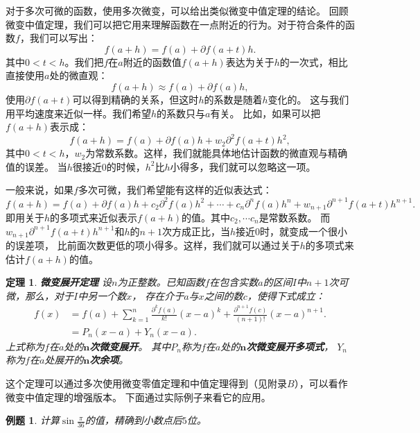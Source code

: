 \documentclass[12pt,UTF8]{ctexbook}
\newtheorem{tm}{定理}[section]
\newtheorem{et}{例题}[section]
\begin{document}
对于多次可微的函数，使用多次微变，可以给出类似微变中值定理的结论。
回顾微变中值定理，我们可以把它用来理解函数在一点附近的行为。对于符合条件的函数$f$，我们可以写出：
$$ f(a + h) = f(a) + \partial f(a + t) h.$$
其中$0<t<h$。我们把$f$在$a$附近的函数值$f(a+h)$表达为关于$h$的一次式，相比直接使用$a$处的微直观：
$$ f(a + h) \approx f(a) + \partial f(a) h,$$
使用$\partial f(a + t)$可以得到精确的关系，但这时$h$的系数是随着$h$变化的。
这与我们用平均速度来近似一样。我们希望$h$的系数只与$a$有关。
比如，如果可以把$f(a + h)$表示成：
$$ f(a + h) = f(a) + \partial f(a) h + w_2\partial^2 f(a + t) h^2,$$
其中$0<t<h$，$w_2$为常数系数。这样，我们就能具体地估计函数的微直观与精确值的误差。
当$h$很接近$0$的时候，$h^2$比$h$小得多，我们就可以忽略这一项。

一般来说，如果$f$多次可微，我们希望能有这样的近似表达式：
$$ f(a + h) = f(a) + \partial f(a) h + c_2 \partial^2 f(a) h^2 + \cdots + c_n \partial^n f(a) h^n + w_{n+1}\partial^{n+1} f(a + t) h^{n+1}.$$
即用关于$h$的多项式来近似表示$f(a + h)$的值。其中$c_2, \cdots c_n$是常数系数。
而$w_{n+1}\partial^{n+1} f(a + t) h^{n+1}$和$h$的$n+1$次方成正比，当$h$接近$0$时，就变成一个很小的误差项，
比前面次数更低的项小得多。这样，我们就可以通过关于$h$的多项式来估计$f(a + h)$的值。

\begin{tm}{\textbf{微变展开定理}}
    设$n$为正整数。已知函数$f$在包含实数$a$的区间$I$中$n+1$次可微，那么，对于$I$中另一个数$x$，
    存在介于$a$与$x$之间的数$c$，使得下式成立：
    \begin{align*}
        f(x) &= f(a) + \sum_{k=1}^n \frac{\partial^k f (a)}{k!}(x - a)^k + \frac{\partial^{n+1} f (c)}{(n+1)!}(x - a)^{n+1}.  \\
        &= P_n(x - a) + Y_n(x - a). 
    \end{align*}
    上式称为$f$在$a$处的$\boldsymbol{n}$\textbf{次微变展开}。
    其中$P_n$称为$f$在$a$处的$\boldsymbol{n}$\textbf{次微变展开多项式}，
    $Y_n$称为$f$在$a$处展开的$\boldsymbol{n}$\textbf{次余项}。
    
\end{tm}

这个定理可以通过多次使用微变零值定理和中值定理得到（见附录$B$），可以看作微变中值定理的增强版本。
下面通过实际例子来看它的应用。

\begin{et}
    计算$\sin{\frac{\pi}{36}}$的值，精确到小数点后$5$位。
\end{et}
\end{document}
